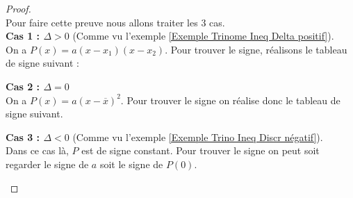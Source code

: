 \documentclass[12pt,fleqn]{report} %
\begin{document}
\begin{proof}\text{ }\\
	
	Pour faire cette preuve nous allons traiter les 3 cas. \\
	
	\textbf{Cas 1 : $\Delta >0$} (Comme vu l'exemple \ref{Exemple Trinome Ineq Delta positif}).\\
	On a $P(x) = a(x - x_1)(x - x_2)$. Pour trouver le signe, réalisons le tableau de signe suivant : 
	
	\begin{center}
	\end{center}
	
	\textbf{Cas 2 : $\Delta = 0$}\\
	On a $P(x) = a\left(x - \overline{x}\right)^2$. Pour trouver le signe on réalise donc le tableau de signe suivant.
	
	\begin{center}
	\end{center}
	
	
	
	\textbf{Cas 3 : $\Delta < 0$} (Comme vu l'exemple \ref{Exemple Trino Ineq Discr négatif}).\\
	Dans ce cas là, $P$ est de signe constant. Pour trouver le signe on peut soit regarder le signe de $a$ soit le signe de $P(0)$.
	
	\begin{center}
	\end{center}
\end{proof}
\end{document}
